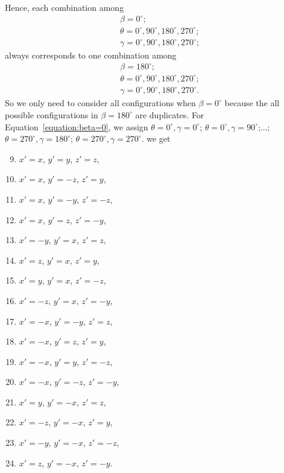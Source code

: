 Hence, each combination among 
\begin{equation}
\begin{aligned}
&\beta=0^{\circ};\\
&\theta=0^{\circ}, 90^{\circ}, 180^{\circ}, 270^{\circ};\\
&\gamma=0^{\circ}, 90^{\circ}, 180^{\circ}, 270^{\circ};
\end{aligned}
\end{equation}
always corresponds to one combination among 
\begin{equation}
\begin{aligned}
&\beta=180^{\circ};\\
&\theta=0^{\circ}, 90^{\circ}, 180^{\circ}, 270^{\circ};\\
&\gamma=0^{\circ}, 90^{\circ}, 180^{\circ}, 270^{\circ}.
\end{aligned}
\end{equation}
So we only need to consider all configurations when $\beta=0^{\circ}$ because the all possible configurations in $\beta=180^{\circ}$ are duplicates. For Equation~\ref{equation:beta=0}, we assign $\theta=0^{\circ},\gamma=0^{\circ}$; $\theta=0^{\circ},\gamma=90^{\circ}$;...;$\theta=270^{\circ},\gamma=180^{\circ}$; $\theta=270^{\circ},\gamma=270^{\circ}$. we get
\begin{enumerate}
  \setcounter{enumi}{8}
  \item  $x'=x$,   $y'=y$,    $z'=z$,
  \item  $x'=x$,   $y'=-z$,   $z'=y$, 
  \item  $x'=x$,   $y'=-y$,   $z'=-z$, 
  \item  $x'=x$,   $y'=z$,    $z'=-y$,
  \item  $x'=-y$,  $y'=x$,    $z'=z$,
  \item  $x'=z$,   $y'=x$,    $z'=y$,
  \item  $x'=y$,   $y'=x$,    $z'=-z$,
  \item  $x'=-z$,  $y'=x$,    $z'=-y$,
  \item  $x'=-x$,  $y'=-y$,   $z'=z$,
  \item  $x'=-x$,  $y'=z$,    $z'=y$,
  \item  $x'=-x$,  $y'=y$,    $z'=-z$,
  \item  $x'=-x$,  $y'=-z$,   $z'=-y$,
  \item  $x'=y$,   $y'=-x$,   $z'=z$,
  \item  $x'=-z$,  $y'=-x$,   $z'=y$,
  \item  $x'=-y$,  $y'=-x$,   $z'=-z$,
  \item  $x'=z$,   $y'=-x$,   $z'=-y$.
  \label{3Drotation24situations3}
\end{enumerate}
